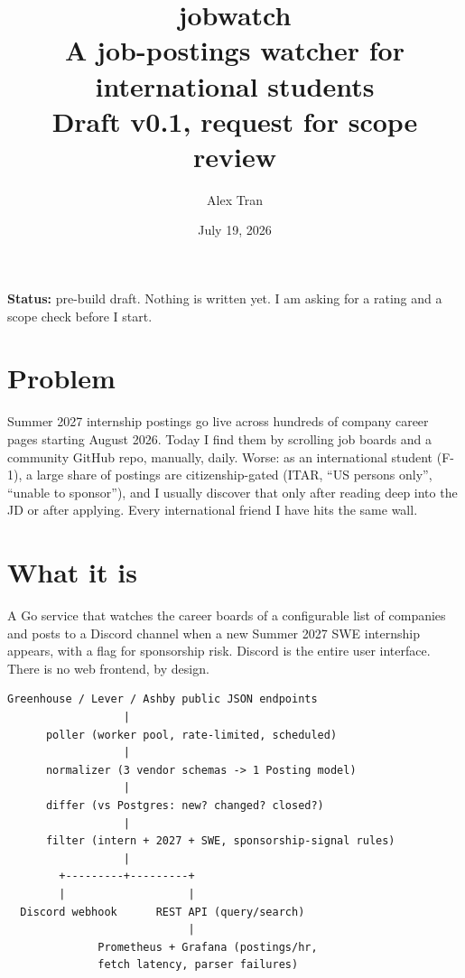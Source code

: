 \documentclass[11pt]{article}
\title{\textbf{jobwatch} \\ \large A job-postings watcher for international students \\ \normalsize Draft v0.1, request for scope review}
\author{Alex Tran}
\date{July 19, 2026}
\newcommand{\statustag}[1]{\textcolor{accent}{\textbf{#1}}}
\begin{document}
\maketitle

\noindent\statustag{Status:} pre-build draft. Nothing is written yet. I am asking for a rating and a scope check before I start.

\section*{Problem}

Summer 2027 internship postings go live across hundreds of company career pages starting August 2026. Today I find them by scrolling job boards and a community GitHub repo, manually, daily. Worse: as an international student (F-1), a large share of postings are citizenship-gated (ITAR, ``US persons only'', ``unable to sponsor''), and I usually discover that only after reading deep into the JD or after applying. Every international friend I have hits the same wall.

\section*{What it is}

A Go service that watches the career boards of a configurable list of companies and posts to a Discord channel when a new Summer 2027 SWE internship appears, with a flag for sponsorship risk. Discord is the entire user interface. There is no web frontend, by design.

\begin{center}
\begin{minipage}{0.85\textwidth}
\begin{verbatim}
Greenhouse / Lever / Ashby public JSON endpoints
                  |
      poller (worker pool, rate-limited, scheduled)
                  |
      normalizer (3 vendor schemas -> 1 Posting model)
                  |
      differ (vs Postgres: new? changed? closed?)
                  |
      filter (intern + 2027 + SWE, sponsorship-signal rules)
                  |
        +---------+---------+
        |                   |
  Discord webhook      REST API (query/search)
                            |
              Prometheus + Grafana (postings/hr,
              fetch latency, parser failures)
\end{verbatim}
\end{minipage}
\end{center}
\end{document}
